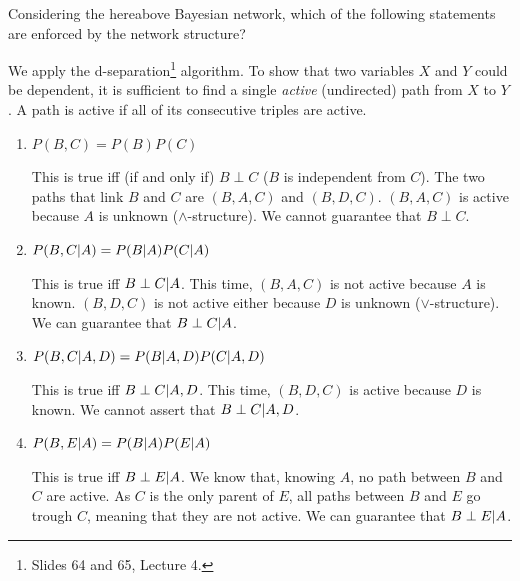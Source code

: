 \documentclass[11pt, a4paper]{article}
\begin{document}
Considering the hereabove Bayesian network, which of the following statements are enforced by the network structure?

\begin{solution}
    We apply the d-separation\footnote{Slides 64 and 65, Lecture 4.} algorithm. To show that two variables $X$ and $Y$ could be dependent, it is sufficient to find a single \emph{active} (undirected) path from $X$ to $Y$. A path is active if all of its consecutive triples are active.
\end{solution}

\begin{enumerate}
    \item $P(B, C) = P(B) P(C)$

    \begin{solution}
        This is true iff (if and only if) $B \perp C$ ($B$ is independent from $C$). The two paths that link $B$ and $C$ are $(B, A, C)$ and $(B, D, C)$. $(B, A, C)$ is active because $A$ is unknown ($\wedge$-structure). We cannot guarantee that $B \perp C$.
    \end{solution}

    \item $P(B, C \vert A) = P(B \vert A) P(C \vert A)$

    \begin{solution}
        This is true iff $B \perp C \vert A$. This time, $(B, A, C)$ is not active because $A$ is known. $(B, D, C)$ is not active either because $D$ is unknown ($\vee$-structure). We can guarantee that $B \perp C \vert A$.
    \end{solution}

    \item $P(B, C \vert A, D) =  P(B \vert A, D) P(C \vert A, D)$

    \begin{solution}
        This is true iff $B \perp C \vert A, D$. This time, $(B, D, C)$ is active because $D$ is known. We cannot assert that $B \perp C \vert A, D$.
    \end{solution}

    \item $P(B, E \vert A) = P(B \vert A) P(E \vert A)$

    \begin{solution}
        This is true iff $B \perp E \vert A$. We know that, knowing $A$, no path between $B$ and $C$ are active. As $C$ is the only parent of $E$, all paths between $B$ and $E$ go trough $C$, meaning that they are not active. We can guarantee that $B \perp E \vert A$.
    \end{solution}


\end{enumerate}
\end{document}
